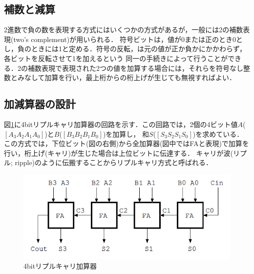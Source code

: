 \documentclass{jlreq}
\numberwithin{equation}{section}
\begin{document}
\subsection{補数と減算}
2進数で負の数を表現する方式にはいくつかの方式があるが，一般には2の補数表現(two's complement)が用いられる．
符号ビットは，値が0または正のとき0とし，負のときには1と定める．符号の反転，は元の値が正か負かにかかわらず，各ビットを反転させて1を加えるという
同一の手続きによって行うことができる．2の補数表現で表現された2つの値を加算する場合には，それらを符号なし整数とみなして加算を行い，最上桁からの桁上げが生じても無視すればよい．

\subsection{加減算器の設計}
図\ref{fig:4bit_ripple_carry_adder}に4bitリプルキャリ加算器の回路を示す．この回路では，2個の4ビット値$A$($[A_3A_2A_1A_0]$)と$B$($[B_3B_2B_1B_0]$)を加算し，
和$S$($[S_3S_2S_1S_0]$)を求めている．この方式では，下位ビット(図の右側)から全加算器(図中ではFAと表現)で加算を行い，桁上げ(キャリ)が生じた場合は上位ビットに伝達する．
キャリが波(リプル; ripple)のように伝搬することからリプルキャリ方式と呼ばれる．
\begin{figure}
  \centering
  \includegraphics{assets/4bit_ripple_carry_adder.png}
  \caption{4bitリプルキャリ加算器}
  \label{fig:4bit_ripple_carry_adder}
\end{figure}
\end{document}
